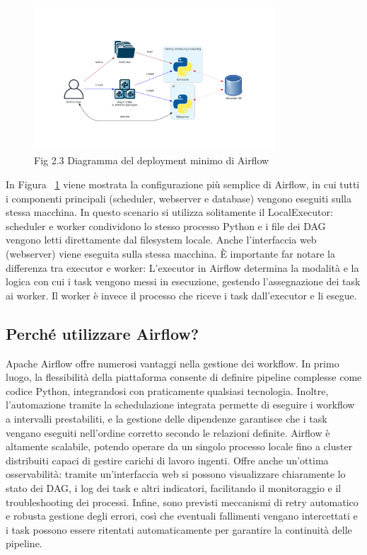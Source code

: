 \begin{figure}[h]
    \centering
    \includegraphics[width=0.8\textwidth]{img/diagram_basic_airflow_architecture.png}
    \caption{Fig 2.3 Diagramma del deployment minimo di Airflow}
    \label{fig:airflow_minimal_deployment}
\end{figure}

In Figura ~\ref{fig:airflow_minimal_deployment} viene mostrata la configurazione più semplice di Airflow, in cui tutti i componenti principali (scheduler, webserver e database) vengono eseguiti sulla stessa macchina. In questo scenario si utilizza solitamente il LocalExecutor: scheduler e worker condividono lo stesso processo Python e i file dei DAG vengono letti direttamente dal filesystem locale. Anche l’interfaccia web (webserver) viene eseguita sulla stessa macchina. È importante far notare la differenza tra executor e worker: 
L’executor in Airflow determina la modalità e la logica con cui i task vengono messi in esecuzione, gestendo l’assegnazione dei task ai worker.
Il worker è invece il processo che riceve i task dall’executor e li esegue.

\subsection{Perché utilizzare Airflow?}
\label{sec:percheairflow}
Apache Airflow offre numerosi vantaggi nella gestione dei workflow. In primo luogo, la flessibilità della piattaforma consente di definire pipeline complesse come codice Python, integrandosi con praticamente qualsiasi tecnologia. Inoltre, l’automazione tramite la schedulazione integrata permette di eseguire i workflow a intervalli prestabiliti, e la gestione delle dipendenze garantisce che i task vengano eseguiti nell’ordine corretto secondo le relazioni definite. Airflow è altamente scalabile, potendo operare da un singolo processo locale fino a cluster distribuiti capaci di gestire carichi di lavoro ingenti. Offre anche un’ottima osservabilità: tramite un’interfaccia web si possono visualizzare chiaramente lo stato dei DAG, i log dei task e altri indicatori, facilitando il monitoraggio e il troubleshooting dei processi. Infine, sono previsti meccanismi di retry automatico e robusta gestione degli errori, così che eventuali fallimenti vengano intercettati e i task possono essere ritentati automaticamente per garantire la continuità delle pipeline.


